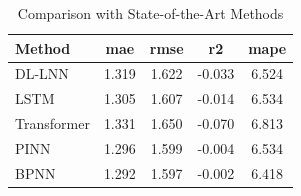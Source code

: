 \begin{table}[htbp]
\centering
\caption{Comparison with State-of-the-Art Methods}
\label{tab:table3_main_results_industrial}
\begin{tabular}{lcccc}
\toprule
Method & \textbf{mae} & \textbf{rmse} & \textbf{r2} & \textbf{mape} \\
\midrule
DL-LNN & 1.319 & 1.622 & -0.033 & 6.524 \\
LSTM & 1.305 & 1.607 & -0.014 & 6.534 \\
Transformer & 1.331 & 1.650 & -0.070 & 6.813 \\
PINN & 1.296 & 1.599 & -0.004 & 6.534 \\
BPNN & 1.292 & 1.597 & -0.002 & 6.418 \\
\bottomrule
\end{tabular}
\end{table}